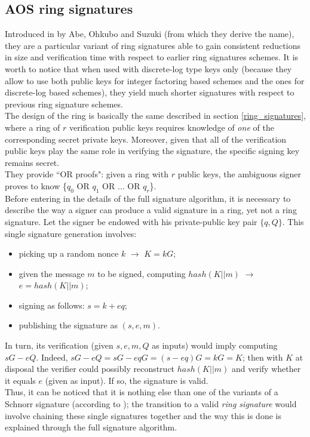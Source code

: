 \subsection{AOS ring signatures}
\label{AOS_ring}
Introduced in \cite{AOS} by Abe, Ohkubo and Suzuki (from which they derive the name), they are a particular variant of ring signatures able to gain consistent reductions in size and verification time with respect to earlier ring signatures schemes. It is worth to notice that when used with discrete-log type keys only (because they allow to use both public keys for integer factoring based schemes and the ones for discrete-log based schemes), they yield much shorter signatures with respect to previous ring signature schemes.\\
The design of the ring is basically the same described in section \ref{ring_signatures}, where a ring of $r$ verification public keys requires knowledge of \textit{one} of the corresponding secret private keys. Moreover, given that all of the verification public keys play the same role in verifying the signature, the specific signing key remains secret.\\ 
They provide ``OR proofs": given a ring with $r$ public keys, the ambiguous signer proves to know \{$q_0$ OR $q_1$ OR $\dots$ OR $q_r$\}.\\
Before entering in the details of the full signature algorithm, it is necessary to describe the way a signer can produce a valid signature in a ring, yet not a ring signature. Let the signer be endowed with his private-public key pair $\{q, Q\}$. This single signature generation involves:
\begin{itemize}
    \item picking up a random nonce $k$ $\rightarrow$ $K = kG$;
    \item given the message $m$ to be signed, computing $hash(K||m)$ $\rightarrow$ $e = hash(K||m)$;
    \item signing as follows: $s = k + eq$;
    \item publishing the signature as $(s,e,m)$.
\end{itemize}
In turn, its verification (given $s, e, m, Q$ as inputs) would imply computing $sG - eQ$. Indeed, $sG - eQ = sG - eqG = (s - eq)G = kG = K$; then with $K$ at disposal the verifier could possibly reconstruct $hash(K||m)$ and verify whether it equals $e$ (given as input). If so, the signature is valid. \\
Thus, it can be noticed that it is nothing else than one of the variants of a Schnorr signature (according to \cite{Schnorr}); the transition to a valid \textit{ring signature} would involve chaining these single signatures together and the way this is done is explained through the full signature algorithm.\\
